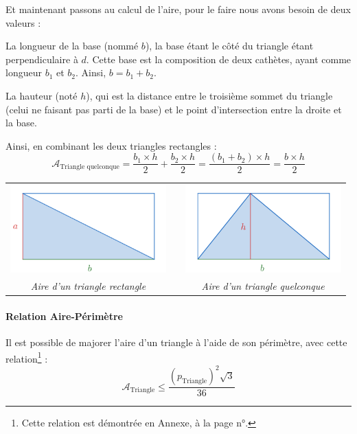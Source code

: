 \documentclass[a4paper, twoside]{article}
\begin{document}
\medbreak

Et maintenant passons au calcul de l'aire,
pour le faire nous avons besoin de deux valeurs :

La longueur de la base (nommé $b$),
la base étant le côté du triangle étant perpendiculaire à $d$.
Cette base est la composition de deux cathètes, ayant comme longueur $b_1$ et $b_2$.
Ainsi, $b = b_1 + b_2$.

La hauteur (noté $h$),
qui est la distance entre le troisième sommet du triangle (celui ne faisant pas parti de la base) et le point d'intersection entre la droite et la base.

Ainsi, en combinant les deux triangles rectangles :
$$ \mathcal{A}_{\text{Triangle quelconque}} = \frac{b_1 \times h}{2} + \frac{b_2 \times h}{2} = \frac{(b_1+b_2) \times h}{2} = \frac{b \times h}{2} $$

\begin{center}
	\begin{tabular}{ccc}
		\includegraphics[width=6cm]{Image/Aire triangle rectangle.png} &               & \includegraphics[width=6cm]{Image/Aire triangle quelconque.png} \\
		\textit{Aire d'un triangle rectangle}                          & \phantom{cou} & \textit{Aire d'un triangle quelconque}                          \\
	\end{tabular}
\end{center}

\paragraph*{Relation Aire-Périmètre}

\phantom{text}

Il est possible de majorer l'aire d'un triangle à l'aide de son périmètre, 
avec cette relation\footnote{
	Cette relation est démontrée en Annexe, à la page n°\pageref{relation_aire_perim_triangle}.
} :
$$ \mathcal{A}_{\text{Triangle}} \leq \frac{(p_{\text{Triangle}})^2 \sqrt {3}} {36} $$
\end{document}
